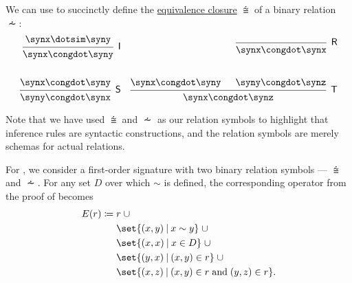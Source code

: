 \begin{example}\label{ex:recursively_defined_relation}
  We can use  to succinctly define the \hyperref[thm:equivalence_closure]{equivalence closure} \( {\congdot} \) of a binary relation \( {\dotsim} \):
  \begin{align*}
    \begin{prooftree}
      \hypo{ \synx \dotsim \syny }
      \infer1[\logic{I}]{ \synx \congdot \syny }
    \end{prooftree}
    &&
    \begin{prooftree}
      \infer0[\logic{R}]{ \synx \congdot \synx }
    \end{prooftree}
    \\\\
    \begin{prooftree}
      \hypo{ \synx \congdot \syny }
      \infer1[\logic{S}]{ \syny \congdot \synx }
    \end{prooftree}
    &&
    \begin{prooftree}
      \hypo{ \synx \congdot \syny }
      \hypo{ \syny \congdot \synz }
      \infer2[\logic{T}]{ \synx \congdot \synz }
    \end{prooftree}
  \end{align*}

  Note that we have used \( {\congdot} \) and \( {\dotsim} \) as our relation symbols to highlight that inference rules are syntactic constructions, and the relation symbols are merely schemas for actual relations.

  For , we consider a first-order signature with two binary relation symbols --- \( {\congdot} \) and \( {\dotsim} \). For any set \( D \) over which \( {\sim} \) is defined, the corresponding operator from the proof of  becomes
  \begin{equation*}
    \begin{aligned}
      E(r) \coloneqq \thickspace & r \thickspace {\cup} \\
                                 & \set{ (x, y) \given x \sim y } \thickspace {\cup} \\
                                 & \set{ (x, x) \given x \in D } \thickspace {\cup} \\
                                 & \set{ (y, x) \given (x, y) \in r } \thickspace {\cup} \\
                                 & \set{ (x, z) \given (x, y) \in r \T{and} (y, z) \in r }.
    \end{aligned}
  \end{equation*}


\end{example}
